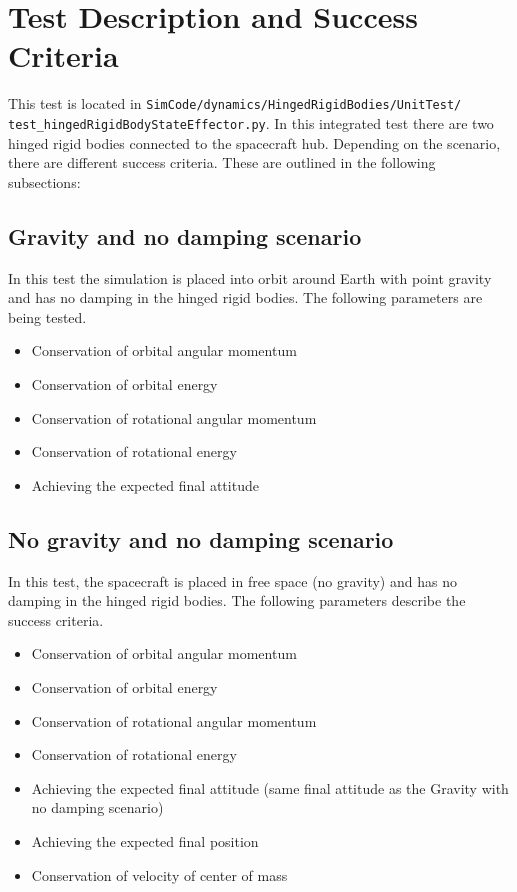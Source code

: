 \section{Test Description and Success Criteria}
This test is located in \texttt{SimCode/dynamics/HingedRigidBodies/UnitTest/\newline
test\_hingedRigidBodyStateEffector.py}. In this integrated test there are two hinged rigid bodies connected to the spacecraft hub.  Depending on the scenario, there are different success criteria. These are outlined in the following subsections:
\subsection{Gravity and no damping scenario}
In this test the simulation is placed into orbit around Earth with point gravity and has no damping in the hinged rigid bodies. The following parameters are being tested. 
\begin{itemize}
	\item Conservation of orbital angular momentum
	\item Conservation of orbital energy
	\item Conservation of rotational angular momentum
	\item Conservation of rotational energy
	\item Achieving the expected final attitude
\end{itemize}

\subsection{No gravity and no damping scenario}
In this test, the spacecraft is placed in free space (no gravity) and has no damping in the hinged rigid bodies. The following parameters describe the success criteria.
\begin{itemize}
\item Conservation of orbital angular momentum
\item Conservation of orbital energy
\item Conservation of rotational angular momentum
\item Conservation of rotational energy
\item Achieving the expected final attitude (same final attitude as the Gravity with no damping scenario)
\item Achieving the expected final position
\item Conservation of velocity of center of mass
\end{itemize}

